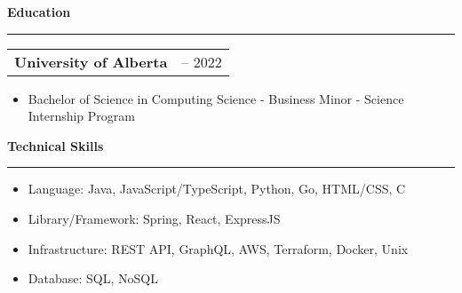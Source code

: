 \documentclass[11pt]{article}
\newenvironment{compactList}
{
  \begin{itemize}
    \setlength{\itemsep}{0pt}
    \setlength{\parskip}{0pt}
}
{\end{itemize}}
\begin{document}
\begin{center}
  \textbf{Education}
  \noindent\rule[10pt]{0.9\paperwidth}{0.4pt}
\end{center}
\vspace{-20pt}
\begin{tabularx}{\textwidth}
  {
    >{\raggedright\arraybackslash}X
    >{\raggedleft\arraybackslash}X
  }
  \textbf{University of Alberta} & 2017 – 2022 \\
\end{tabularx}
\vspace{-20pt}
\begin{itemize}
  \item Bachelor of Science in Computing Science - Business Minor - Science Internship Program
\end{itemize}
\vspace{-15pt}

\begin{center}
  \textbf{Technical Skills}
  \noindent\rule[10pt]{0.9\paperwidth}{0.4pt}
\end{center}
\vspace{-30pt}
\begin{compactList}
  \item Language: Java, JavaScript/TypeScript, Python, Go, HTML/CSS, C
  \item Library/Framework: Spring, React, ExpressJS
  \item Infrastructure: REST API, GraphQL, AWS, Terraform, Docker, Unix
  \item Database: SQL, NoSQL
\end{compactList}
\vspace{-15pt}
\end{document}
